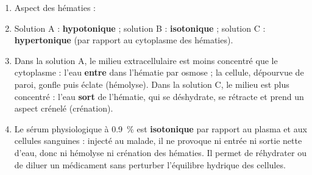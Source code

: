 \documentclass[11pt]{article}
\newcommand{\legende}[1]{\par\vspace{6pt}{\popsemi\fontsize{9}{11.5}\selectfont\color{popmuted}#1}}
\begin{document}
\begin{corrige}
\begin{enumerate}
\item Aspect des hématies :

\begin{popfigure}
\end{popfigure}

\item Solution A : \textbf{hypotonique} ; solution B : \textbf{isotonique} ; solution C : \textbf{hypertonique} (par rapport au cytoplasme des hématies).
\item Dans la solution A, le milieu extracellulaire est moins concentré que le cytoplasme : l'eau \textbf{entre} dans l'hématie par osmose ; la cellule, dépourvue de paroi, gonfle puis éclate (hémolyse). Dans la solution C, le milieu est plus concentré : l'eau \textbf{sort} de l'hématie, qui se déshydrate, se rétracte et prend un aspect crénelé (crénation).
\item Le sérum physiologique à \num{0,9}~\% est \textbf{isotonique} par rapport au plasma et aux cellules sanguines : injecté au malade, il ne provoque ni entrée ni sortie nette d'eau, donc ni hémolyse ni crénation des hématies. Il permet de réhydrater ou de diluer un médicament sans perturber l'équilibre hydrique des cellules.
\end{enumerate}
\end{corrige}
\end{document}
